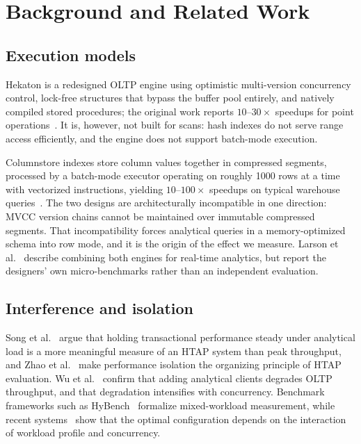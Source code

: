 \documentclass[conference,a4paper]{IEEEtran}
\begin{document}
\section{Background and Related Work}

\subsection{Execution models}

Hekaton is a redesigned OLTP engine using optimistic multi-version concurrency
control, lock-free structures that bypass the buffer pool entirely, and
natively compiled stored procedures; the original work reports $10$--$30\times$
speedups for point operations~\cite{diaconu2013hekaton}. It is, however, not
built for scans: hash indexes do not serve range access efficiently, and the
engine does not support batch-mode execution.

Columnstore indexes store column values together in compressed segments,
processed by a batch-mode executor operating on roughly 1000 rows at a time
with vectorized instructions, yielding $10$--$100\times$ speedups on typical
warehouse queries~\cite{larson2013columnstore}. The two designs are
architecturally incompatible in one direction: MVCC version chains cannot be
maintained over immutable compressed segments. That incompatibility forces
analytical queries in a memory-optimized schema into row mode, and it is the
origin of the effect we measure. Larson et al.~\cite{larson2015realtime}
describe combining both engines for real-time analytics, but report the
designers' own micro-benchmarks rather than an independent evaluation.

\subsection{Interference and isolation}

Song et al.~\cite{song2024survey} argue that holding transactional performance
steady under analytical load is a more meaningful measure of an HTAP system
than peak throughput, and Zhao et al.~\cite{zhao2023benchmarking} make
performance isolation the organizing principle of HTAP evaluation.
Wu et al.~\cite{wu2025htap} confirm that adding analytical clients degrades
OLTP throughput, and that degradation intensifies with concurrency. Benchmark
frameworks such as HyBench~\cite{zhang2024hybench} formalize mixed-workload
measurement, while recent systems~\cite{zhao2025pushtap, zhang2025synchro,
zhan2025vedb} show that the optimal configuration depends on the interaction of
workload profile and concurrency.
\end{document}
